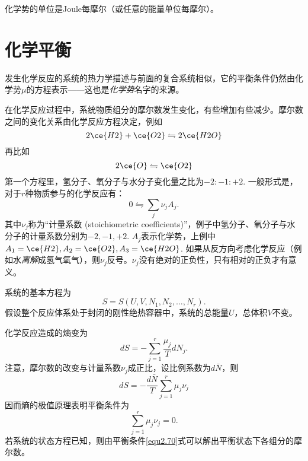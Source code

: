 化学势的单位是Joule每摩尔（或任意的能量单位每摩尔）。


\section{化学平衡}
\label{sec2.9}
发生化学反应的系统的热力学描述与前面的复合系统相似，它的平衡条件仍然由化学势$\mu$的方程表示——这也是{\it 化学势}名字的来源。

在化学反应过程中，系统物质组分的摩尔数发生变化，有些增加有些减少。摩尔数之间的变化关系由化学反应方程决定，例如
\begin{equation}
	2\ce{H2} + \ce{O2} \leftrightharpoons 2 \ce{H2O}
\label{equ2.64}
\end{equation}
再比如
\begin{equation}
	2\ce{O} \leftrightharpoons \ce{O2}
\label{equ2.65}
\end{equation}
第一个方程里，氢分子、氧分子与水分子变化量之比为$-2 : -1 : +2$. 一般形式是，对于$r$种物质参与的化学反应有：
\begin{equation}
	0 \leftrightharpoons \sum_j \nu_j A_j.
\end{equation}
其中$\nu_j$称为“计量系数 (stoichiometric coefficients)”，例子中氢分子、氧分子与水分子的计量系数分别为$-2, -1, +2$. $A_j$表示化学势，上例中$A_1 = \ce{H2}, A_2 = \ce{O2}, A_3 = \ce{H2O}$. 如果从反方向考虑化学反应（例如水{\it 离解}成氢气氧气），则$\nu_j$反号。$\nu_j$没有绝对的正负性，只有相对的正负才有意义。

系统的基本方程为
\begin{equation}
	S = S(U, V, N_1, N_2, \dots, N_r).
\label{equ2.67}
\end{equation}
假设整个反应体系处于封闭的刚性绝热容器中，系统的总能量$U$，总体积$V$不变。

化学反应造成的熵变为
\begin{equation}
	dS = - \sum_{j = 1}^{r} \frac{\mu_j}{T} dN_j.
\label{equ2.68}
\end{equation}
注意，摩尔数的改变与计量系数$\nu_j$成正比，设比例系数为$d\bar{N}$，则
\begin{equation}
	dS = -\frac{d\bar{N}}{T} \sum_{j = 1}^r \mu_j \nu_j
\label{equ2.69}
\end{equation}
因而熵的极值原理表明平衡条件为
\begin{equation}
	\sum_{j = 1}^r \mu_j \nu_j = 0.
\label{equ2.70}
\end{equation}
若系统的状态方程已知，则由平衡条件\eqref{equ2.70}式可以解出平衡状态下各组分的摩尔数。

